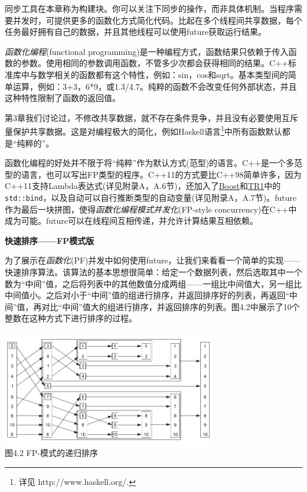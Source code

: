 
同步工具在本章称为构建块。你可以关注下同步的操作，而非具体机制。当程序需要并发时，可提供更多的函数化方式简化代码。比起在多个线程间共享数据，每个任务最好拥有自己的数据，并且其他线程可以使用future获取运行结果。


\textit{函数化编程}(functional programming)是一种编程方式，函数结果只依赖于传入函数的参数。使用相同的参数调用函数，不管多少次都会获得相同的结果。C++标准库中与数学相关的函数都有这个特性，例如：sin，cos和sqrt。基本类型间的简单运算，例如：3+3，6*9，或1.3/4.7。纯粹的函数不会改变任何外部状态，并且这种特性限制了函数的返回值。

第3章我们讨论过，不修改共享数据，就不存在条件竞争，并且没有必要使用互斥量保护共享数据。这是对编程极大的简化，例如Haskell语言\footnote[2]{详见 http://www.haskell.org/.}中所有函数默认都是“纯粹的”。

函数化编程的好处并不限于将“纯粹”作为默认方式(范型)的语言。C++是一个多范型的语言，也可以写出FP类型的程序。C++11的方式要比C++98简单许多，因为C++11支持Lambda表达式(详见附录A，A.6节)，还加入了\href{http://zh.wikipedia.org/wiki/Boost_C%2B%2B_Libraries}{Boost}和\href{http://zh.wikipedia.org/wiki/C%2B%2B_Technical_Report_1}{TR1}中的\texttt{std::bind}，以及自动可以自行推断类型的自动变量(详见附录A，A.7节)。future作为最后一块拼图，使得\textit{函数化编程模式并发化}(FP-style concurrency)在C++中成为可能。future可以在线程间互相传递，并允许计算结果互相依赖。

\textbf{快速排序——FP模式版}

为了展示在\textit{函数化}(PF)并发中如何使用future，让我们来看看一个简单的实现——快速排序算法。该算法的基本思想很简单：给定一个数据列表，然后选取其中一个数为“中间”值，之后将列表中的其他数值分成两组——一组比中间值大，另一组比中间值小。之后对小于“中间”值的组进行排序，并返回排序好的列表，再返回“中间”值，再对比“中间”值大的组进行排序，并返回排序的列表。图4.2中展示了10个整数在这种方式下进行排序的过程。


\begin{center}
  \includegraphics[width=0.7\textwidth]{content/chapter04/images/4-2.png}\\
  图4.2 FP-模式的递归排序
\end{center}



